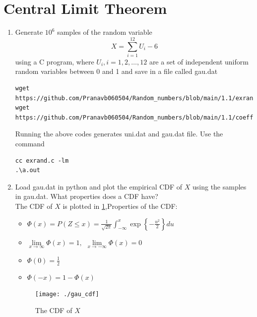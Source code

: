 \documentclass[journal,12pt,twocolumn]{IEEEtran}
\renewcommand\thesection{\arabic{section}}
\begin{document}
\section{Central Limit Theorem}
%
\begin{enumerate}[label=\thesection.\arabic*
,ref=\thesection.\theenumi]

%
\item
Generate $10^6$ samples of the random variable
%
\begin{equation}
X = \sum_{i=1}^{12}U_i -6
\end{equation}
%
using a C program, where $U_i, i = 1,2,\dots, 12$ are  a set of independent uniform random variables between 0 and 1
and save in a file called gau.dat
\\
\solution
\begin{lstlisting}
wget https://github.com/Pranavb060504/Random_numbers/blob/main/1.1/exrand.c
wget https://github.com/Pranavb060504/Random_numbers/blob/main/1.1/coeffs.h
\end{lstlisting}
Running the above codes generates uni.dat and gau.dat file.
Use the command 
\begin{lstlisting}
cc exrand.c -lm
.\a.out
\end{lstlisting}
%
\item
Load gau.dat in python and plot the empirical CDF of $X$ using the samples in gau.dat. What properties does a CDF have?
\\
\solution 
The CDF of $X$ is plotted in \ref{fig:gau_cdf},Properties of the CDF:
\begin{itemize}
\item $\Phi(x)=P(Z \leq x)= \frac{1}{\sqrt{2 \pi}} \int_{-\infty}^{x}\exp\left\{-\frac{u^2}{2}\right\} du$
\item $\lim \limits_{x\rightarrow \infty} \Phi(x)=1, \hspace{5pt} \lim \limits_{x\rightarrow -\infty} \Phi(x)=0$
\item  $\Phi(0)=\frac{1}{2}$
\item  $\Phi(-x)=1-\Phi(x)$
\end{itemize}

\begin{figure}[h]
\centering
\texttt{[image: ./gau\_cdf]}
\caption{The CDF of $X$}
\label{fig:gau_cdf}
\end{figure}


\end{enumerate}
\end{document}
